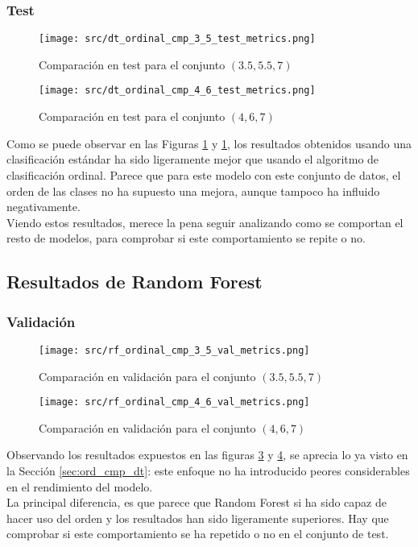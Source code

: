 \subsubsection*{Test}
\begin{figure}[H]
	\centering
	\texttt{[image: src/dt\_ordinal\_cmp\_3\_5\_test\_metrics.png]}
	\caption{Comparación en test para el conjunto  $(3.5,5.5,7)$}
	\label{fig:dt_ordin_test_cmp_1}
\end{figure}
\begin{figure}[H]
	\centering
	\texttt{[image: src/dt\_ordinal\_cmp\_4\_6\_test\_metrics.png]}
	\caption{Comparación en test para el conjunto  $(4,6,7)$}
	\label{fig:dt_ordin_test_cmp_2}
\end{figure}
Como se puede observar en las Figuras \ref{fig:dt_ordin_test_cmp_1} y \ref{fig:dt_ordin_test_cmp_1}, los resultados obtenidos usando una clasificación estándar ha sido ligeramente mejor que usando el algoritmo de clasificación ordinal. Parece que para este modelo con este conjunto de datos, el orden de las clases no ha supuesto una mejora, aunque tampoco ha influido negativamente.\\
\linebreak
Viendo estos resultados, merece la pena seguir analizando como se comportan el resto de modelos, para comprobar si este comportamiento se repite o no.
\clearpage
\subsection{Resultados de Random Forest}
\label{sec:ord_cmp_rf}
\subsubsection*{Validación}
\begin{figure}[H]
	\centering
	\texttt{[image: src/rf\_ordinal\_cmp\_3\_5\_val\_metrics.png]}
	\caption{Comparación en validación para el conjunto  $(3.5,5.5,7)$ }
	\label{fig:rf_ordin_val_cmp_1}
\end{figure}
\begin{figure}[H]
	\centering
	\texttt{[image: src/rf\_ordinal\_cmp\_4\_6\_val\_metrics.png]}
	\caption{Comparación en validación para el conjunto $(4,6,7)$}
	\label{fig:rf_ordin_val_cmp_2}
\end{figure}
Observando los resultados expuestos en las figuras \ref{fig:rf_ordin_val_cmp_1} y \ref{fig:rf_ordin_val_cmp_2}, se aprecia lo ya visto en la Sección \ref{sec:ord_cmp_dt}: este enfoque no ha introducido peores considerables en el rendimiento del modelo.\\
\linebreak
La principal diferencia, es que parece que Random Forest si ha sido capaz de hacer uso del orden y los resultados han sido ligeramente superiores. Hay que comprobar si este comportamiento se ha repetido o no en el conjunto de test.
\clearpage
